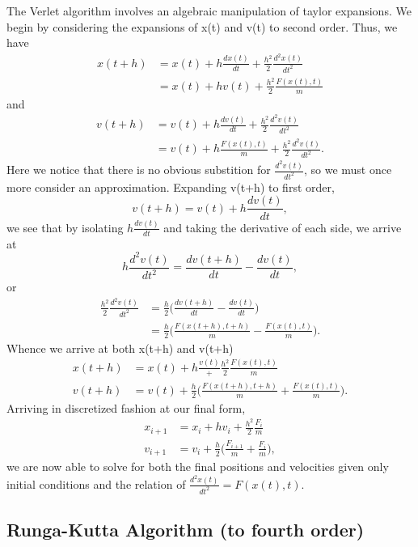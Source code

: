 \documentclass[11pt,a4paper]{article}
\begin{document}
The Verlet algorithm involves an algebraic manipulation of taylor expansions. We begin by considering the expansions of x(t) and v(t) to second order. Thus, we have
\begin{align}
x(t+h) 	&= x(t) + h\frac{dx(t)}{dt} + \frac{h^2}{2}\frac{d^2x(t)}{dt^2} \\
		&= x(t) + hv(t) + \frac{h^2}{2}\frac{F(x(t),t)}{m}
\end{align}
and
\begin{align}
v(t+h) 	&= v(t) + h\frac{dv(t)}{dt} + \frac{h^2}{2}\frac{d^2v(t)}{dt^2} \\
		&= v(t) + h\frac{F(x(t),t)}{m} + \frac{h^2}{2}\frac{d^2v(t)}{dt^2}.
\end{align}
Here we notice that there is no obvious substition for $\frac{d^2v(t)}{dt^2}$, so we must once more consider an approximation. Expanding v(t+h) to first order,
\begin{equation}
v(t+h) 	= v(t) + h\frac{dv(t)}{dt},
\end{equation}
we see that by isolating $h\frac{dv(t)}{dt}$ and taking the derivative of each side, we arrive at
\begin{equation}
h\frac{d^2v(t)}{dt^2} = \frac{dv(t+h)}{dt} - \frac{dv(t)}{dt},
\end{equation}
or
\begin{align}
\frac{h^2}{2}\frac{d^2v(t)}{dt^2} &= \frac{h}{2}\bigg(\frac{dv(t+h)}{dt} - \frac{dv(t)}{dt}\bigg) \\
									&= \frac{h}{2}\bigg(\frac{F(x(t+h),t+h)}{m} - \frac{F(x(t),t)}{m}\bigg).
\end{align}
Whence we arrive at both x(t+h) and v(t+h)
\begin{align}
x(t+h) 	&= x(t) + h\frac{v(t)} + \frac{h^2}{2}\frac{F(x(t),t)}{m} \\
v(t+h)	&= v(t) + \frac{h}{2}\bigg(\frac{F(x(t+h),t+h)}{m} + \frac{F(x(t),t)}{m}\bigg).
\end{align}
Arriving in discretized fashion at our final form,
\begin{align}
x_{i+1} &= x_i + hv_i + \frac{h^2}{2}\frac{F_i}{m} \\
v_{i+1}	&= v_i + \frac{h}{2}\bigg(\frac{F_{i+1}}{m} + \frac{F_i}{m}\bigg),
\end{align}
we are now able to solve for both the final positions and velocities given only initial conditions and the relation of $\frac{d^2x(t)}{dt^2} = F(x(t), t)$.

\subsection{Runga-Kutta Algorithm (to fourth order)}
\end{document}
